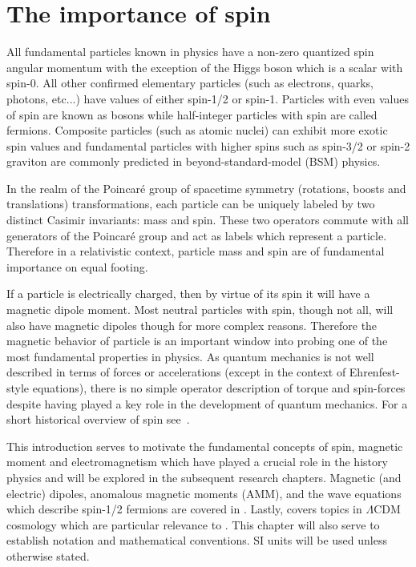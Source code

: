 \chapter{The importance of spin}
\label{chap:intro}
\noindent All fundamental particles known in physics have a non-zero quantized spin angular momentum with the exception of the Higgs boson which is a scalar with spin-0. All other confirmed elementary particles (such as electrons, quarks, photons, etc...) have values of either spin-1/2 or spin-1. Particles with even values of spin are known as bosons while half-integer particles with spin are called fermions. Composite particles (such as atomic nuclei) can exhibit more exotic spin values and fundamental particles with higher spins such as spin-3/2 or spin-2 graviton are commonly predicted in beyond-standard-model (BSM) physics.

In the realm of the Poincar{\'e} group of spacetime symmetry (rotations, boosts and translations) transformations, each particle can be uniquely labeled by two distinct Casimir invariants: mass and spin. These two operators commute with all generators of the Poincar{\'e} group and act as labels which represent a particle. Therefore in a relativistic context, particle mass and spin are of fundamental importance on equal footing.

If a particle is electrically charged, then by virtue of its spin it will have a magnetic dipole moment. Most neutral particles with spin, though not all, will also have magnetic dipoles though for more complex reasons. Therefore the magnetic behavior of particle is an important window into probing one of the most fundamental properties in physics. As quantum mechanics is not well described in terms of forces or accelerations (except in the context of Ehrenfest-style equations), there is no simple operator description of torque and spin-forces despite having played a key role in the development of quantum mechanics. For a short historical overview of spin see~\cite{Ohanian:1986wg}.

This introduction serves to motivate the fundamental concepts of spin, magnetic moment and electromagnetism which have played a crucial role in the history physics and will be explored in the subsequent research chapters. Magnetic (and electric) dipoles, anomalous magnetic moments (AMM), and the wave equations which describe spin-1/2 fermions are covered in . Lastly,  covers topics in $\Lambda\mathrm{CDM}$ cosmology which are particular relevance to . This chapter will also serve to establish notation and mathematical conventions. SI units will be used unless otherwise stated.

